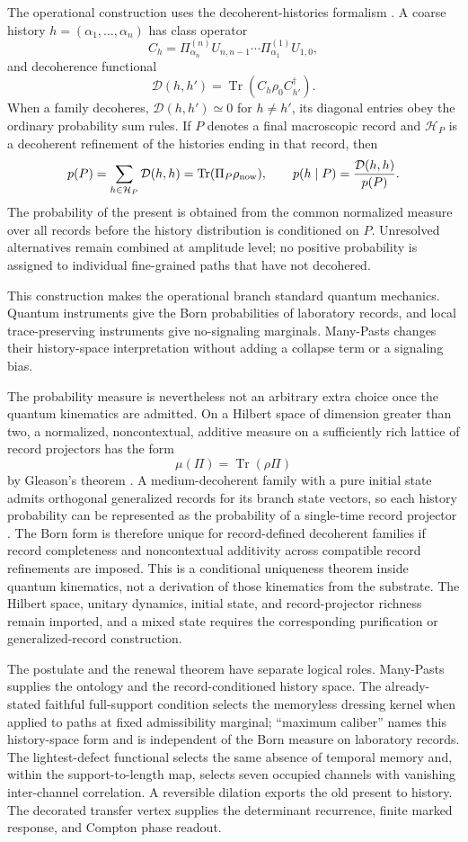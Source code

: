 \documentclass[11pt]{article}
\begin{document}
The operational construction uses the decoherent-histories formalism \citep{Halliwell1994}. A coarse history $h=(\alpha_1,\ldots,\alpha_n)$ has class operator
\[
C_h=\Pi^{(n)}_{\alpha_n}U_{n,n-1}\cdots
\Pi^{(1)}_{\alpha_1}U_{1,0},
\]
and decoherence functional
\[
\mathcal D(h,h')=\operatorname{Tr}\!\left(C_h\rho_0C_{h'}^\dagger\right).
\]
When a family decoheres, $\mathcal D(h,h')\simeq0$ for $h\ne h'$, its diagonal entries obey the ordinary probability sum rules. If $P$ denotes a final macroscopic record and $\mathcal H_P$ is a decoherent refinement of the histories ending in that record, then
\[
p(P)=\sum_{h\in\mathcal H_P}\mathcal D(h,h)
=\operatorname{Tr}(\Pi_P\rho_{\rm now}),
\qquad
p(h\mid P)=\frac{\mathcal D(h,h)}{p(P)}.
\]
The probability of the present is obtained from the common normalized measure over all records before the history distribution is conditioned on $P$. Unresolved alternatives remain combined at amplitude level; no positive probability is assigned to individual fine-grained paths that have not decohered.

This construction makes the operational branch standard quantum mechanics. Quantum instruments give the Born probabilities of laboratory records, and local trace-preserving instruments give no-signaling marginals. Many-Pasts changes their history-space interpretation without adding a collapse term or a signaling bias.

The probability measure is nevertheless not an arbitrary extra choice once the quantum kinematics are admitted. On a Hilbert space of dimension greater than two, a normalized, noncontextual, additive measure on a sufficiently rich lattice of record projectors has the form
\[
\mu(\Pi)=\operatorname{Tr}(\rho\Pi)
\]
by Gleason's theorem \citep{Gleason1957}. A medium-decoherent family with a pure initial state admits orthogonal generalized records for its branch state vectors, so each history probability can be represented as the probability of a single-time record projector \citep{Hartle2016}. The Born form is therefore unique for record-defined decoherent families if record completeness and noncontextual additivity across compatible record refinements are imposed. This is a conditional uniqueness theorem inside quantum kinematics, not a derivation of those kinematics from the substrate. The Hilbert space, unitary dynamics, initial state, and record-projector richness remain imported, and a mixed state requires the corresponding purification or generalized-record construction.

The postulate and the renewal theorem have separate logical roles. Many-Pasts supplies the ontology and the record-conditioned history space. The already-stated faithful full-support condition selects the memoryless dressing kernel when applied to paths at fixed admissibility marginal; ``maximum caliber'' names this history-space form and is independent of the Born measure on laboratory records. The lightest-defect functional selects the same absence of temporal memory and, within the support-to-length map, selects seven occupied channels with vanishing inter-channel correlation. A reversible dilation exports the old present to history. The decorated transfer vertex supplies the determinant recurrence, finite marked response, and Compton phase readout.
\end{document}
